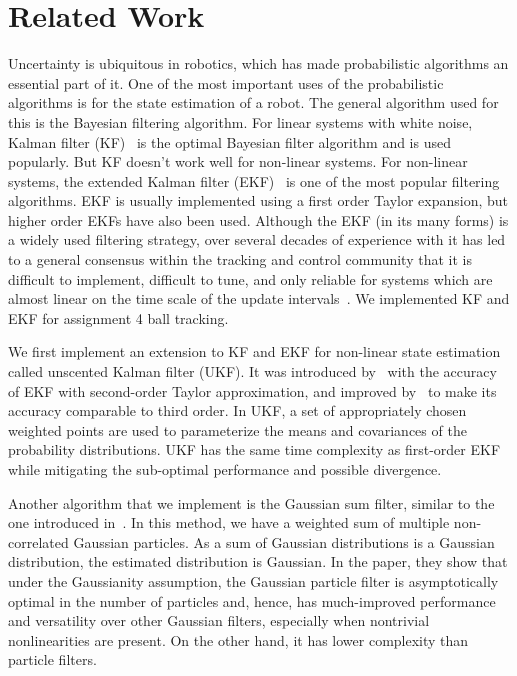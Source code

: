 \section{Related Work}
Uncertainty is ubiquitous in robotics, which has made probabilistic algorithms an essential part of it. One of the most important uses of the probabilistic algorithms is for the state estimation of a robot. The general algorithm used for this is the Bayesian filtering algorithm. For linear systems with white noise, Kalman filter (KF)~\cite{kalman,prob} is the optimal Bayesian filter algorithm and is used popularly. But KF doesn't work well for non-linear systems. For non-linear systems, the extended Kalman filter (EKF)~\cite{prob} is one of the most popular filtering algorithms. EKF is usually implemented using a first order Taylor expansion, but higher order EKFs have also been used. Although the EKF (in its many forms) is a widely used filtering strategy, over several decades of experience with it has led to a general consensus within the tracking and control community that it is difficult to implement, difficult to tune, and only reliable for systems which are almost linear on the time scale of the update intervals~\cite{ukf1}. We implemented KF and EKF for assignment 4 ball tracking.

We first implement an extension to KF and EKF for non-linear state estimation called unscented Kalman filter (UKF). It was introduced by~\cite{ukf1,ukf3} with the accuracy of EKF with second-order Taylor approximation, and improved by~\cite{ukf2} to make its accuracy comparable to third order. In UKF, a set of appropriately chosen weighted points are used to parameterize the means and covariances of the probability distributions. UKF has the same time complexity as first-order EKF while mitigating the sub-optimal performance and possible divergence.

Another algorithm that we implement is the Gaussian sum filter, similar to the one introduced in~\cite{gpf}. In this method, we have a weighted sum of multiple non-correlated Gaussian particles. As a sum of Gaussian distributions is a Gaussian distribution, the estimated distribution is Gaussian. In the paper, they show that under the Gaussianity assumption, the Gaussian particle filter is asymptotically optimal in the number of particles and, hence, has much-improved performance and versatility over other Gaussian filters, especially when nontrivial nonlinearities are present. On the other hand, it has lower complexity than particle filters.

